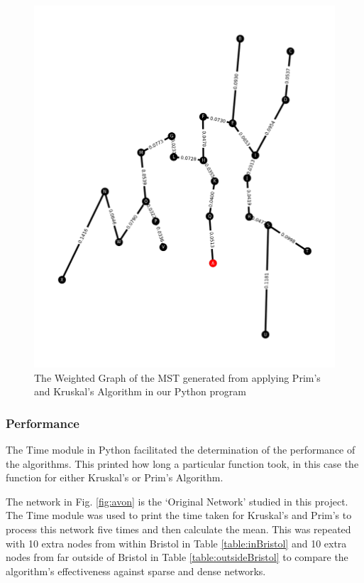 \documentclass[twocolumn]{article}
\begin{document}
\begin{figure}[H]
\centering
\includegraphics[width=1.2\columnwidth]{Figures/MST Output.png}
\caption{The Weighted Graph of the MST generated from applying Prim’s and Kruskal’s Algorithm in our Python program}
\label{fig:mstOUT}
\end{figure}


\subsubsection{Performance}

The Time module in Python facilitated the determination of the performance of the algorithms. This printed how long a particular function took, in this case the function for either Kruskal’s or Prim’s Algorithm.

The network in Fig. \ref{fig:avon} is the ‘Original Network’ studied in this project. The Time module was used to print the time taken for Kruskal’s and Prim’s to process this network five times and then calculate the mean. This was repeated with 10 extra nodes from within Bristol in Table \ref{table:inBristol} and 10 extra nodes from far outside of Bristol in Table \ref{table:outsideBristol} to compare the algorithm’s effectiveness against sparse and dense networks.
\end{document}
